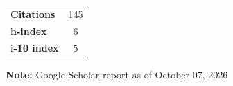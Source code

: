 \noindent\begin{minipage}[t]{0.60\textwidth}
\printarticlesummary
\end{minipage}\hfill
\begin{minipage}[t]{0.36\textwidth}
  \begin{center}
  \begin{tabular}{|lc|}
  \hline
  \textbf{Citations} & 145 \\
  \textbf{h-index} & 6  \\
  \textbf{i-10 index}  & 5  \\
  \hline 
  \end{tabular}
  \end{center}
\end{minipage}

\begin{center}
\par\noindent\textbf{Note:} Google Scholar report as of October 07, 2026
\end{center}
